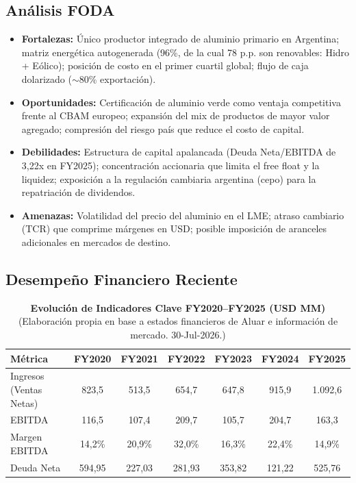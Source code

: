 \documentclass[10pt,a4paper]{article}
\begin{document}
\subsection{Análisis FODA}
\begin{itemize}
    \item \textbf{Fortalezas:} Único productor integrado de aluminio primario en Argentina; matriz energética autogenerada (96\%, de la cual 78 p.p. son renovables: Hidro + Eólico); posición de costo en el primer cuartil global; flujo de caja dolarizado ($\sim$80\% exportación).
    \item \textbf{Oportunidades:} Certificación de aluminio verde como ventaja competitiva frente al CBAM europeo; expansión del mix de productos de mayor valor agregado; compresión del riesgo país que reduce el costo de capital.
    \item \textbf{Debilidades:} Estructura de capital apalancada (Deuda Neta/EBITDA de 3,22x en FY2025); concentración accionaria que limita el free float y la liquidez; exposición a la regulación cambiaria argentina (cepo) para la repatriación de dividendos.
    \item \textbf{Amenazas:} Volatilidad del precio del aluminio en el LME; atraso cambiario (TCR) que comprime márgenes en USD; posible imposición de aranceles adicionales en mercados de destino.
\end{itemize}

\subsection{Desempeño Financiero Reciente}
\begin{table}[H]
\centering
\caption{\textbf{Evolución de Indicadores Clave FY2020–FY2025 (USD MM)} {\small\color{gsgray} (Elaboración propia en base a estados financieros de Aluar e información de mercado. 30-Jul-2026.)}}
\small
\begin{tabular}{lcccccc}
\toprule
\textbf{Métrica} & \textbf{FY2020} & \textbf{FY2021} & \textbf{FY2022} & \textbf{FY2023} & \textbf{FY2024} & \textbf{FY2025} \\
\midrule
Ingresos (Ventas Netas) & 823,5 & 513,5 & 654,7 & 647,8 & 915,9 & 1.092,6 \\
EBITDA & 116,5 & 107,4 & 209,7 & 105,7 & 204,7 & 163,3 \\
Margen EBITDA & 14,2\% & 20,9\% & 32,0\% & 16,3\% & 22,4\% & 14,9\% \\
Deuda Neta & 594,95 & 227,03 & 281,93 & 353,82 & 121,22 & 525,76 \\
\bottomrule
\end{tabular}
\end{table}
\end{document}
